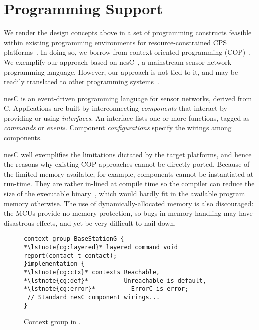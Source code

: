 \section{Programming Support}
\label{sec:conesc}

We render the design concepts above in a set of programming constructs
feasible within existing programming environments for
resource-constrained CPS platforms~\cite{mottola10:survey}. In doing
so, we borrow from context-oriented programming
(COP)~\cite{Hirschfeld08}. We exemplify our approach based on
nesC~\cite{gay03nesc}, a mainstream sensor network programming
language. However, our approach is not tied to it, and may be readily
translated to other programming systems~\cite{mottola10:survey}.

 nesC is an event-driven programming language
for sensor networks, derived from C. Applications are built by
interconnecting \emph{components} that interact by providing or using
\emph{interfaces}. An interface lists one or more functions, tagged as
\emph{commands} or \emph{events}. %
Component \emph{configurations} specify the wirings among
components. %

nesC well exemplifies the limitations dictated by the target
platforms, and hence the reasons why existing COP approaches cannot be
directly ported. Because of the limited memory available, for example,
components cannot be instantiated at run-time. They are rather
in-lined at compile time so the compiler can reduce the size of the
executable binary~\cite{gay03nesc}, which would hardly fit in the available
program memory otherwise.  The use of dynamically-allocated memory is
also discouraged: the MCUs provide no memory protection, so bugs in
memory handling may have disastrous effects, and yet be very difficult
to nail down.

\begin{figure}[!tb]
\begin{lstlisting}[style=conescframe]
context group BaseStationG {
*\lstnote{cg:layered}* layered command void report(contact_t contact);
}implementation {
*\lstnote{cg:ctx}* contexts Reachable, 
*\lstnote{cg:def}*          Unreachable is default,
*\lstnote{cg:error}*          ErrorC is error;
 // Standard nesC component wirings...
}
\end{lstlisting}
\vspace{-4mm}
\caption{Context group in \conesc.}
  \label{fig:configuration}
\vspace{-4mm}
\end{figure}

